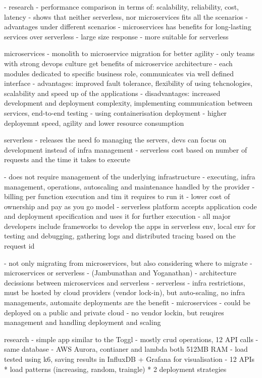 - research - performance comparison in terms of: scalability, reliability, cost, latency
- shows that neither serverless, nor microservices fits all the scenarios - advantages under different scenarios
- microservices has benefits for long-lasting services over serverless
- large size response - more suitable for serverless

microservices
- monolith to microservice migration for better agility
- only teams with strong devops culture get benefits of microservice architecture
- each modules dedicated to specific business role, communicates via well defined interface
- advantages: improved fault tolerance, flexibility of using tehcnologies, scalability and speed up of the applications
- disadvantages: increased development and deployment complexity, implementing communication between services, end-to-end testing
- using containerisation deployment - higher deployemnt speed, agility and lower resource consumption

serverless
- releases the need fo managing the servers, devs can focus on development instead of infra management
- serverless cost based on number of requests and the time it takes to execute

- does not require management of the underlying infrastructure - executing, infra management, operations, autoscaling and maintenance handled by the provider
- billing per function execution and tim it requires to run it - lower cost of ownership and pay as you go model
- serverless platform accepts application code and deployment specification and uses it for further execution
- all major developers include frameworks to develop the apps in serverless env, local env for testing and debugging, gathering logs and distributed tracing based on the request id

- not only migrating from microservices, but also considering where to migrate - microservices or serverless
- (Jambunathan and Yoganathan) - architecture decissions between microservices and serverless
- serverless - infra restrictions, must be hosted by cloud providers (vendor lock-in), but auto-scaling, no infra managements, automaitc deployments are the benefit
- microservices - could be deployed on a public and private cloud - no vendor lockin, but reuqires management and handling deployment and scaling

research
- simple app similar to the Toggl - mostly crud operations, 12 API calls
- same database - AWS Aurora, contianer and lambda both 512MB RAM
- load tested using k6, saving results in InfluxDB + Grafana for visualisation
- 12 APIs * load patterns (increasing, random, traingle) * 2 deployment strategies

